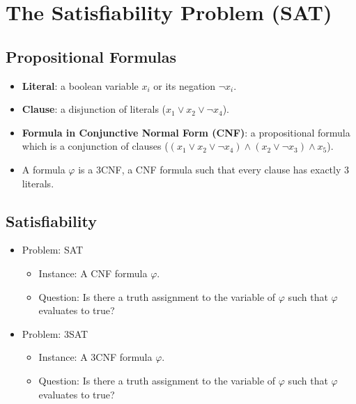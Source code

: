 
\section{The Satisfiability Problem (SAT)}

\subsection{Propositional Formulas}
\begin{itemize}
    \item \textbf{Literal}: a boolean variable $x_i$ or its negation $\neg x_i$.
    \item \textbf{Clause}: a disjunction of literals ($x_1 \lor x_2 \lor \neg x_4$).
    \item \textbf{Formula in Conjunctive Normal Form (CNF)}: a propositional formula which is a conjunction of clauses ($(x_1 \lor x_2 \lor \neg x_4) \land (x_2 \lor \neg x_3) \land x_5$).
    \item A formula $\varphi$ is a 3CNF, a CNF formula such that every clause has exactly 3 literals.
\end{itemize}

\subsection{Satisfiability}
\begin{itemize}
    \item Problem: SAT
    \begin{itemize}
        \item Instance: A CNF formula $\varphi$.
        \item Question: Is there a truth assignment to the variable of $\varphi$ such that $\varphi$ evaluates to true?
    \end{itemize}
    \item Problem: 3SAT
    \begin{itemize}
        \item Instance: A 3CNF formula $\varphi$.
        \item Question: Is there a truth assignment to the variable of $\varphi$ such that $\varphi$ evaluates to true?
    \end{itemize}
\end{itemize}

